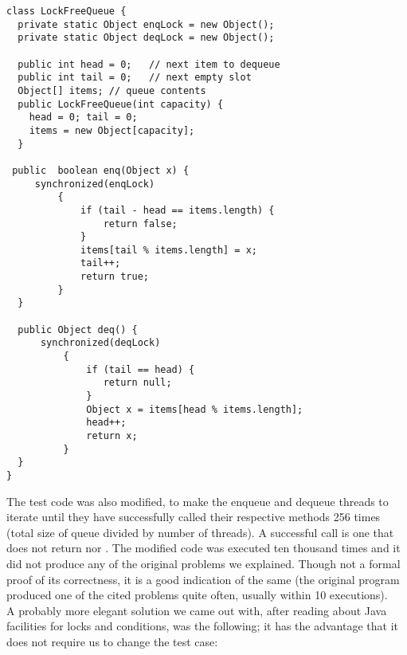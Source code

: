 \begin{lstlisting}[style=nonumbers]
class LockFreeQueue {
  private static Object enqLock = new Object();
  private static Object deqLock = new Object();
    
  public int head = 0;   // next item to dequeue
  public int tail = 0;   // next empty slot
  Object[] items; // queue contents
  public LockFreeQueue(int capacity) {
    head = 0; tail = 0;
    items = new Object[capacity];
  }

 public  boolean enq(Object x) {
     synchronized(enqLock)
         {
             if (tail - head == items.length) {
                 return false;
             }
             items[tail % items.length] = x;
             tail++;
             return true;
         }
  }

  public Object deq() {
      synchronized(deqLock)
          {
              if (tail == head) {
                 return null;
              }
              Object x = items[head % items.length];
              head++;
              return x;
          }
  }
}

\end{lstlisting}
\hfill

The test code was also modified, to make the enqueue and dequeue
threads to iterate until they have successfully called their
respective methods 256 times (total size of queue divided by number of
threads). A successful call is one that does not return  nor
. The modified code was executed ten thousand times and it did
not produce any of the original problems we explained. Though not a
formal proof of its correctness, it is a good indication of the same
(the original program produced one of the cited problems quite often,
usually within 10 executions). \\

A probably more elegant solution we came out with, after reading about
Java facilities for locks and conditions, was the following; it has
the advantage that it does not require us to change the test case: \\ 

